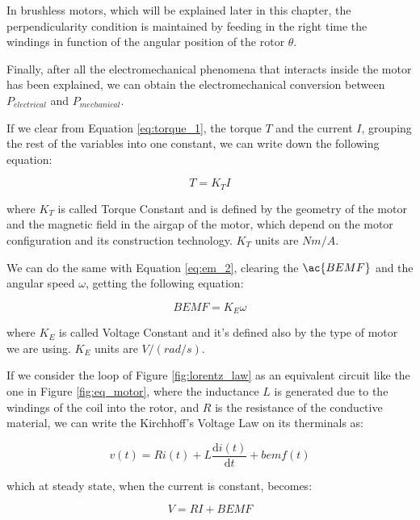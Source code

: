 In brushless motors, which will be explained later in this chapter, the perpendicularity condition is maintained by feeding in the right time the windings in function of the angular position of the rotor $\theta$.

Finally, after all the electromechanical phenomena that interacts inside the motor has been explained, we can obtain the electromechanical conversion between $P_{electrical}$ and $P_{mechanical}$.

If we clear from Equation \ref{eq:torque_1}, the torque $T$ and the current $I$, grouping the rest of the variables into one constant, we can write down the following equation:

\begin{equation}
	\label{eq:kt}
	T = K_{T} I
\end{equation}

where $K_{T}$ is called Torque Constant and is defined by the geometry of the motor and the magnetic field in the airgap of the motor, which depend on the motor configuration and its construction technology. $K_{T}$ units are $Nm/A$.

We can do the same with Equation \ref{eq:em_2}, clearing the $\ac{BEMF}$ and the angular speed $\omega$, getting the following equation:

\begin{equation}
	\label{eq:ke}
	BEMF = K_{E} \omega
\end{equation}

where $K_{E}$ is called Voltage Constant and it's defined also by the type of motor we are using. $K_{E}$ units are $V/(rad/s)$.

If we consider the loop of Figure \ref{fig:lorentz_law} as an equivalent circuit like the one in Figure \ref{fig:eq_motor}, where the inductance $L$ is generated due to the windings of the coil into the rotor, and $R$ is the resistance of the conductive material, we can write the Kirchhoff's Voltage Law on its therminals as:

\begin{equation} 
	\label{eq:KVL_coil_time}
	v(t) = R i(t) + L  \frac{\mathrm{d} i(t)}{\mathrm{d} t} + bemf(t)
\end{equation}

which at steady state, when the current is constant, becomes:

\begin{equation}
	\label{eq:KVL_coil}
	V = R I + BEMF
\end{equation}


